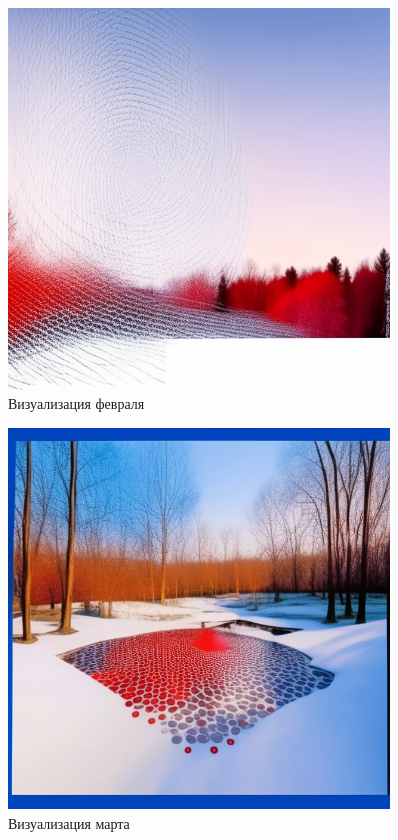 \begin{figure}[H]
	\caption{Визуализация февраля}
	\includegraphics[width=0.9\textwidth]{img/feb.jpeg}
\end{figure}

\begin{figure}[H]
	\caption{Визуализация марта}
	\includegraphics[width=0.9\textwidth]{img/mar.jpeg}
\end{figure}

